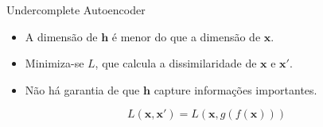 \documentclass{beamer}
\begin{document}
\begin{frame}{Undercomplete Autoencoder}

	\justifying

	\begin{itemize}
		\item A dimensão de $\boldsymbol{h}$ é menor do que a dimensão de $\boldsymbol{x}$.
		\item Minimiza-se $L$, que calcula a dissimilaridade de $\boldsymbol{x}$ e $\boldsymbol{x'}$.
		\item Não há garantia de que $\boldsymbol{h}$ capture informações importantes.
	\end{itemize}

	\begin{equation*}
		L(\boldsymbol{x}, \boldsymbol{x'}) = L(\boldsymbol{x}, g(f(\boldsymbol{x})))
	\end{equation*}

\end{frame}
\end{document}
